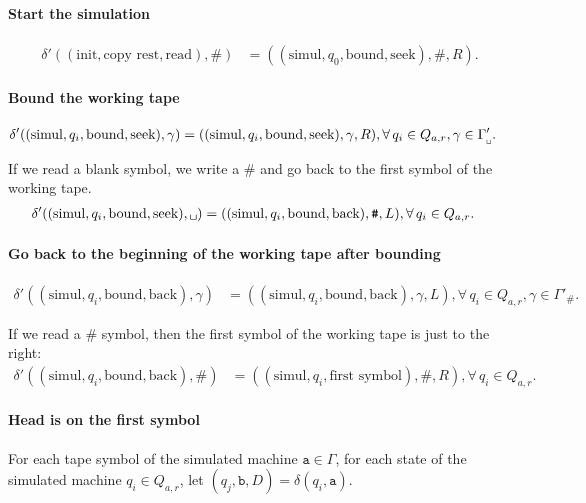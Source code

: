\documentclass{article}
\newcommand{\0}{\texttt{\textvisiblespace}}
\newcommand{\°}{\obullet{\0}}
\newcommand{\s}{\texttt{a}}
\newcommand{\w}{\texttt{b}}
\newcommand{\e}{\texttt{\#}}
\newcommand{\gpwb}{\Gamma'_{\0{}}}
\newcommand{\gpwe}{\Gamma'_{\e{}}}
\newcommand{\qwar}{Q_{a,r}}
\begin{document}
\paragraph{Start the simulation}
\begin{align}
  \delta'((\text{init},\text{copy rest},\text{read}), \e)
  &= ((\text{simul},q_0, \text{bound}, \text{seek}), \e, R).
\end{align}

\paragraph{Bound the working tape}
\begin{align}
  \delta'((\text{simul}, q_i, \text{bound}, \text{seek}),\gamma)
  &=((\text{simul},
  q_i, \text{bound}, \text{seek}),\gamma,R),
  \forall\,
  q_i \in \qwar,
  \gamma \in \gpwb.
\end{align}

If we read a blank symbol, we write a $\e$ and go back to the first symbol
of the working tape.
\begin{align}
  \delta'((\text{simul}, q_i, \text{bound}, \text{seek}),\0{})
  &=((\text{simul},
  q_i, \text{bound}, \text{back}),\e,L),
  \forall\,
  q_i \in \qwar.
\end{align}

\paragraph{Go back to the beginning of the working tape after bounding}
\begin{align}
  \delta'((\text{simul}, q_i, \text{bound}, \text{back}),\gamma)
  &=((\text{simul},
  q_i, \text{bound}, \text{back}),\gamma,L),
  \forall\,
  q_i \in \qwar,
  \gamma \in \gpwe.
\end{align}

If we read a $\e$ symbol, then the first symbol of the working tape is just to
the right:
\begin{align}
  \delta'((\text{simul}, q_i, \text{bound}, \text{back}),\e{})
  &=((\text{simul},
  q_i, \text{first symbol}),\e,R),
  \forall\,
  q_i \in \qwar.
\end{align}

\paragraph{Head is on the first symbol}
For each tape symbol of the simulated machine $\s \in \Gamma$,
for each state of the simulated machine $q_i \in \qwar$,
let $(q_j, \w, D)=\delta(q_i,\s)$.
\end{document}
